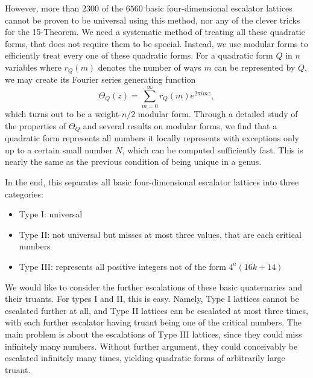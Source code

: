 \documentclass[letterpaper, 12pt]{article}
\begin{document}
However, more than $2300$ of the $6560$ basic four-dimensional escalator lattices cannot be proven to be universal using this method, nor any of the clever tricks for the 15-Theorem. We need a systematic method of treating all these quadratic forms, that does not require them to be special.
Instead, we use modular forms to efficiently treat every one of these quadratic forms. For a quadratic form $Q$ in $n$ variables where $r_Q(m)$ denotes the number of ways $m$ can be represented by $Q$, we may create its Fourier series generating function
\[\Theta_Q(z) = \sum_{m = 0}^{\infty} r_Q(m) e^{2\pi i m z},\]
which turns out to be a weight-$n/2$ modular form. Through a detailed study of the properties of $\Theta_Q$ and several results on modular forms, we find that a quadratic form represents all numbers it locally represents with exceptions only up to a certain small number $N$, which can be computed sufficiently fast. This is nearly the same as the previous condition of being unique in a genus.

In the end, this separates all basic four-dimensional escalator lattices into three categories:
\begin{itemize}
    \item Type I: universal
    \item Type II: not universal but misses at most three values, that are each critical numbers
    \item Type III: represents all positive integers not of the form $4^a(16k+14)$
\end{itemize}
We would like to consider the further escalations of these basic quaternaries and their truants.
For types I and II, this is easy.
Namely, Type I lattices cannot be escalated further at all, and Type II lattices can be escalated at most three times, with each further escalator having truant being one of the critical numbers.
The main problem is about the escalations of Type III lattices, since they could miss infinitely many numbers. Without further argument, they could conceivably be escalated infinitely many times, yielding quadratic forms of arbitrarily large truant.
\end{document}
